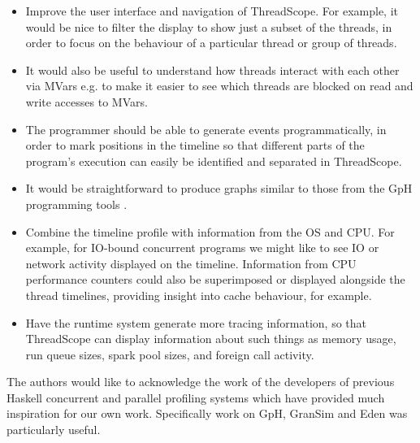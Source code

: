 \documentclass[twocolumn,9pt]{sigplanconf}
\newcommand{\codef}[1]{{\fontfamily{cmss}\small#1}}
\let\cite=\citep
\begin{document}
\begin{itemize}
\item Improve the user interface and navigation of ThreadScope.  For
  example, it would be nice to filter the display to show just a
  subset of the threads, in order to focus on the behaviour of a
  particular thread or group of threads.

\item It would also be useful to understand how threads interact with each 
   other via \codef{MVars} e.g. to make it easier to see which 
   threads are blocked on read and write accesses to \codef{MVar}s.

\item The programmer should be able to generate events
  programmatically, in order to mark positions in the timeline so that
  different parts of the program's execution can easily be identified
  and separated in ThreadScope.

\item It would be straightforward to produce graphs similar to those
  from the GpH programming tools \cite{trinder:02}.

\item Combine the timeline profile with information from the OS and
  CPU.  For example, for IO-bound concurrent programs we might like to
  see IO or network activity displayed on the timeline.  Information
  from CPU performance counters could also be superimposed or
  displayed alongside the thread timelines, providing insight into
  cache behaviour, for example.

\item Have the runtime system generate more tracing information, so
  that ThreadScope can display information about such things as memory
  usage, run queue sizes, spark pool sizes, and foreign call activity.
\end{itemize}

The authors would like to acknowledge the work of the developers
of previous Haskell concurrent and parallel profiling systems
which have provided much inspiration for our own work. Specifically
work on GpH, GranSim and Eden was particularly useful.

{\small


}
\end{document}
